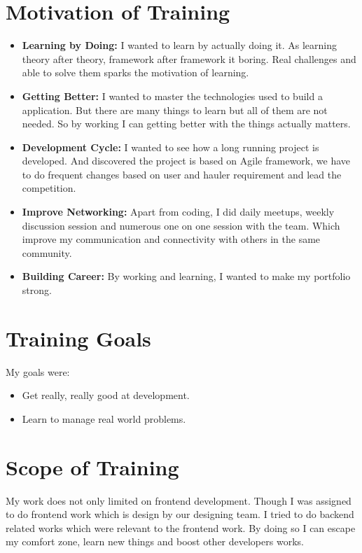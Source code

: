 \section{Motivation of Training}

\begin{itemize}
    \item \textbf{Learning by Doing:} I wanted to learn by actually doing it. As learning theory after theory, framework after framework it boring. Real challenges and able to solve them sparks the motivation of learning.
    \item \textbf{Getting Better:} I wanted to master the technologies used to build a application. But there are many things to learn but all of them are not needed. So by working I can getting better with the things actually matters.
    \item \textbf{Development Cycle:} I wanted to see how a long running project is developed. And discovered the project is based on Agile framework, we have to do frequent changes based on user and hauler requirement and lead the competition.
    \item \textbf{Improve Networking:} Apart from coding, I did daily meetups, weekly discussion session and numerous one on one session with the team. Which improve my communication and connectivity with others in the same community.
    \item \textbf{Building Career:} By working and learning, I wanted to make my portfolio strong.
\end{itemize}

\section{Training Goals}

\par My goals were:

\begin{itemize}
    \item Get really, really good at development.
    \item Learn to manage real world problems.
\end{itemize}

\section{Scope of Training}

\par My work does not only limited on frontend development. Though I was assigned to do frontend work which is design by our designing team. I tried to do backend related works which were relevant to the frontend work. By doing so I can escape my comfort zone, learn new things and boost other developers works.

